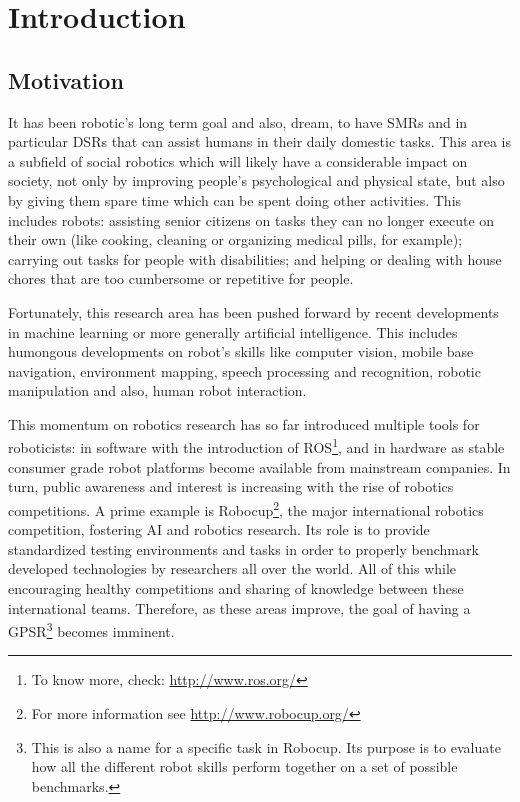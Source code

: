 
\chapter{Introduction}
\label{chapter:introduction}

\section{Motivation}

It has been robotic's long term goal and also, dream, to
have \glspl{SMR} and in particular \glspl{DSR} that can assist humans in
their daily domestic tasks.
This area is a subfield of social robotics which will likely have a considerable
impact on society, not only by improving people's psychological and physical
state, but also by giving them spare time which can be spent doing other
activities. This includes robots: assisting senior citizens
on tasks they can no longer execute on their own (like cooking,
cleaning or organizing medical pills, for example); carrying out tasks for
people with disabilities; and helping or dealing with house chores that are too
cumbersome or repetitive for people. \par

Fortunately, this research area has been pushed forward by recent developments
in machine learning or more generally artificial intelligence. This includes
humongous developments on robot's skills like computer vision, mobile base
navigation, environment mapping, speech processing and recognition, robotic
manipulation and also, human robot interaction.
\par

This momentum on robotics research has so far introduced multiple tools for
roboticists: in software with the introduction of \gls{ROS}\footnote{To know more, check:
\url{http://www.ros.org/}}, and in hardware as stable consumer grade robot
platforms become available from mainstream companies. In turn, public awareness
and interest is increasing with the rise of robotics competitions.
A prime example is Robocup\footnote{For more information see
\url{http://www.robocup.org/}}, the major international robotics competition,
fostering \gls{AI} and robotics research. Its role is to provide
standardized testing environments and tasks in order to properly benchmark
developed technologies by researchers all over the world. All of this while
encouraging healthy competitions and sharing of knowledge between these
international teams.
Therefore, as these areas improve, the goal of having a \gls{GPSR}\footnote{
This is also a name for a specific task in Robocup. Its purpose is to evaluate
how all the different robot skills perform together on a set of possible benchmarks.} 
becomes imminent. 
\par

